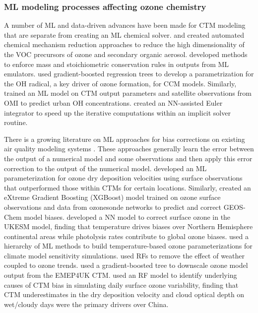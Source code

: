 \documentclass[gmd, manuscript]{copernicus}
\begin{document}
\subsubsection{ML modeling processes affecting ozone chemistry}
A number of ML and data-driven advances have been made for CTM modeling that are separate from creating an ML chemical solver. \citet{wiser_amore-isoprene_2023} and \citet{wang_implementation_2023} created automated chemical mechanism reduction approaches to reduce the high dimensionality of the VOC precursors of ozone and secondary organic aerosol. \citet{sturm_conservation_2022, sturm_mass-_2020} developed methods to enforce mass and stoichiometric conservation rules in outputs from ML emulators. \citet{anderson_machine_2022} used gradient-boosted regression trees to develop a parametrization for the OH radical, a key driver of ozone formation, for CCM models. Similarly, \citet{zhu_combining_2022} trained an ML model on CTM output parameters and satellite observations from OMI to predict urban OH concentrations. \citet{huang_neural_2022} created an NN-assisted Euler integrator to speed up the iterative computations within an implicit solver routine. 

There is a growing literature on ML approaches for bias corrections on existing air quality modeling systems \citep{Neal2014, Borrego2011, Silibello2015}. These approaches generally learn the error between the output of a numerical model and some observations and then apply this error correction to the output of the numerical model. \citet{silva_deep_2019} developed an ML parameterization for ozone dry deposition velocities using surface observations that outperformed those within CTMs for certain locations. Similarly, \citet{ivatt_improving_2020} created an eXtreme Gradient Boosting (XGBoost) model trained on ozone surface observations and data from ozonesonde networks to predict and correct GEOS-Chem model biases. \citet{liu_correcting_2022} developed a NN model to correct surface ozone in the UKESM model, finding that temperature drives biases over Northern Hemisphere continental areas while photolysis rates contribute to global ozone biases. \citet{nowack_using_2018} used a hierarchy of ML methods to build temperature-based ozone parameterizations for climate model sensitivity simulations. \citet{colombi_why_2023} used RFs to remove the effect of weather coupled to ozone trends. \citet{Gouldsbrough2024} used a gradient-boosted tree to downscale ozone model output from the EMEP4UK CTM. \citet{ye_diagnosing_2022} used an RF model to identify underlying causes of CTM bias in simulating daily surface ozone variability, finding that CTM underestimates in the dry deposition velocity and cloud optical depth on wet/cloudy days were the primary drivers over China. 
 
\end{document}
